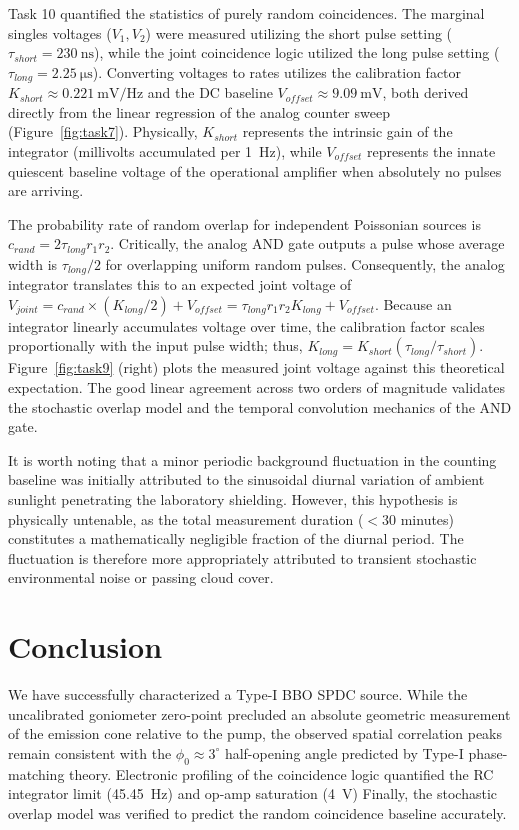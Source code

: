 \documentclass[12pt,a4paper]{article}
\begin{document}
Task 10 quantified the statistics of purely random coincidences. The marginal singles voltages ($V_1, V_2$) were measured utilizing the short pulse setting ($\tau_{short} = \SI{230}{\nano\second}$), while the joint coincidence logic utilized the long pulse setting ($\tau_{long} = \SI{2.25}{\micro\second}$). Converting voltages to rates utilizes the calibration factor $K_{short} \approx \SI{0.221}{\milli\volt\per\hertz}$ and the DC baseline $V_{offset} \approx \SI{9.09}{\milli\volt}$, both derived directly from the linear regression of the analog counter sweep (Figure~\ref{fig:task7}). Physically, $K_{short}$ represents the intrinsic gain of the integrator (millivolts accumulated per \SI{1}{\hertz}), while $V_{offset}$ represents the innate quiescent baseline voltage of the operational amplifier when absolutely no pulses are arriving. 

The probability rate of random overlap for independent Poissonian sources is $c_{rand} = 2 \tau_{long} r_1 r_2$. Critically, the analog AND gate outputs a pulse whose average width is $\tau_{long} / 2$ for overlapping uniform random pulses. Consequently, the analog integrator translates this to an expected joint voltage of $V_{joint} = c_{rand} \times (K_{long} / 2) + V_{offset} = \tau_{long} r_1 r_2 K_{long} + V_{offset}$. Because an integrator linearly accumulates voltage over time, the calibration factor scales proportionally with the input pulse width; thus, $K_{long} = K_{short}(\tau_{long} / \tau_{short})$. Figure~\ref{fig:task9} (right) plots the measured joint voltage against this theoretical expectation. The good linear agreement across two orders of magnitude validates the stochastic overlap model and the temporal convolution mechanics of the AND gate. 

It is worth noting that a minor periodic background fluctuation in the counting baseline was initially attributed to the sinusoidal diurnal variation of ambient sunlight penetrating the laboratory shielding. However, this hypothesis is physically untenable, as the total measurement duration ($< 30$ minutes) constitutes a mathematically negligible fraction of the diurnal period. The fluctuation is therefore more appropriately attributed to transient stochastic environmental noise or passing cloud cover.

\section{Conclusion}
We have successfully characterized a Type-I BBO SPDC source. While the uncalibrated goniometer zero-point precluded an absolute geometric measurement of the emission cone relative to the pump, the observed spatial correlation peaks remain consistent with the $\phi_0 \approx 3^\circ$ half-opening angle predicted by Type-I phase-matching theory. Electronic profiling of the coincidence logic quantified the RC integrator limit (\SI{45.45}{\hertz}) and op-amp saturation (\SI{4}{\volt}) Finally, the stochastic overlap model was verified to predict the random coincidence baseline accurately.
\end{document}
